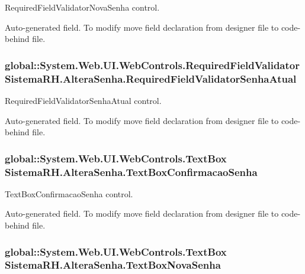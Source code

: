 RequiredFieldValidatorNovaSenha control. 

Auto-\/generated field. To modify move field declaration from designer file to code-\/behind file. \hypertarget{class_sistema_r_h_1_1_altera_senha_a05589ac127845071145e824c72804f46}{
\subsubsection[{RequiredFieldValidatorSenhaAtual}]{\setlength{\rightskip}{0pt plus 5cm}global::System.Web.UI.WebControls.RequiredFieldValidator {\bf SistemaRH.AlteraSenha.RequiredFieldValidatorSenhaAtual}}}
\label{class_sistema_r_h_1_1_altera_senha_a05589ac127845071145e824c72804f46}


RequiredFieldValidatorSenhaAtual control. 

Auto-\/generated field. To modify move field declaration from designer file to code-\/behind file. \hypertarget{class_sistema_r_h_1_1_altera_senha_a0379f111e5829bed2523256699689fba}{
\subsubsection[{TextBoxConfirmacaoSenha}]{\setlength{\rightskip}{0pt plus 5cm}global::System.Web.UI.WebControls.TextBox {\bf SistemaRH.AlteraSenha.TextBoxConfirmacaoSenha}}}
\label{class_sistema_r_h_1_1_altera_senha_a0379f111e5829bed2523256699689fba}


TextBoxConfirmacaoSenha control. 

Auto-\/generated field. To modify move field declaration from designer file to code-\/behind file. \hypertarget{class_sistema_r_h_1_1_altera_senha_a9f931ca7c9b7bb9fd7baf90628f50322}{
\subsubsection[{TextBoxNovaSenha}]{\setlength{\rightskip}{0pt plus 5cm}global::System.Web.UI.WebControls.TextBox {\bf SistemaRH.AlteraSenha.TextBoxNovaSenha}}}
\label{class_sistema_r_h_1_1_altera_senha_a9f931ca7c9b7bb9fd7baf90628f50322}


